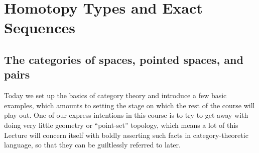 
\chapter{Homotopy Types and Exact Sequences}





\section{The categories of spaces, pointed spaces, and pairs}

Today we set up the basics of category theory and introduce a few basic examples, which amounts to setting the stage on which the rest of the course will play out.
One of our express intentions in this course is to try to get away with doing very little geometry or ``point-set'' topology, which means a lot of this Lecture will concern itself with boldly asserting such facts in category-theoretic language, so that they can be guiltlessly referred to later.

